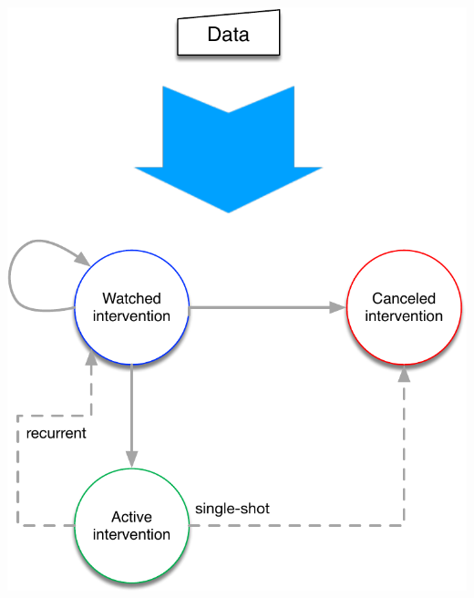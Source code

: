 %
\begin{marginfigure}
    \centering
    \includegraphics[width=\textwidth]{../images/intervention_flow_chart_overview.pdf}
    \caption{%
        Intervention states and possible transitions. Based on specific events,
        the agent can start to watch a specific intervention at any moment.
        That intervention can either become active (delivered to particular
        team members) or canceled if it is no longer relevant. An active
        intervention can be watched again for possible reactivation (recurrent
        intervention), or it can be canceled if it needs to be delivered just a
        single time (single-shot intervention).
    }
    \label{fig:marker_block_intervention_flow_chart_general}
\end{marginfigure}

